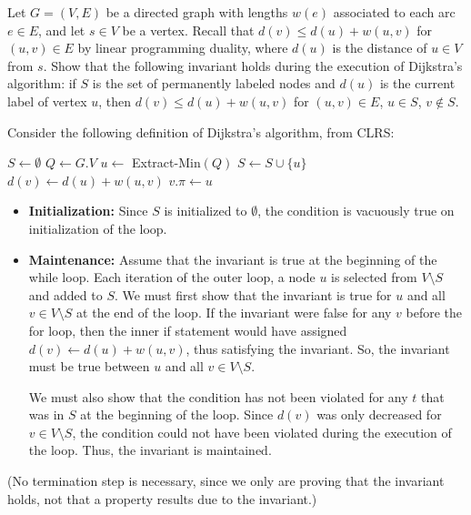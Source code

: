 \documentclass[fleqn]{homework}
\begin{document}
  \begin{problem}{3}
    \begin{question}
      Let $G=(V, E)$ be a directed graph with lengths $w(e)$ associated to each
      arc $e \in E$, and let $s \in V$ be a vertex. Recall that
      $d(v) \le d(u) + w(u,v)$ for $(u,v) \in E$ by linear programming duality,
      where $d(u)$ is the distance of $u \in V$ from $s$. Show that the
      following invariant holds during the execution of Dijkstra's algorithm: if
      $S$ is the set of permanently labeled nodes and $d(u)$ is the current
      label of vertex $u$, then $d(v) \le d(u) + w(u,v)$ for $(u,v) \in E$,
      $u \in S$, $v \not\in S$.
    \end{question}

    Consider the following definition of Dijkstra's algorithm, from CLRS:

    \begin{algorithmic}
        \State $S \gets \emptyset$
        \State $Q \gets G.V$
          \State $u \gets$ Extract-Min$(Q)$
          \State $S \gets S \cup \{u\}$
              \State $d(v) \gets d(u) + w(u,v)$
              \State $v.\pi \gets u$  
            \EndIf
          \EndFor
        \EndWhile
      \EndFunction
    \end{algorithmic}

    \begin{itemize}
    \item \textbf{Initialization:} Since $S$ is initialized to $\emptyset$, the
      condition is vacuously true on initialization of the loop.
    \item \textbf{Maintenance:} Assume that the invariant is true at the
      beginning of the while loop.  Each iteration of the outer loop, a node $u$
      is selected from $V \setminus S$ and added to $S$.  We must first show
      that the invariant is true for $u$ and all $v\in V\setminus S$ at the end
      of the loop.  If the invariant were false for any $v$ before the for loop,
      then the inner if statement would have assigned
      $d(v) \gets d(u) + w(u,v)$, thus satisfying the invariant.  So, the
      invariant must be true between $u$ and all $v \in V \setminus S$.

      We must also show that the condition has not been violated for any $t$
      that was in $S$ at the beginning of the loop.  Since $d(v)$ was only
      decreased for $v \in V \setminus S$, the condition could not have been
      violated during the execution of the loop.  Thus, the invariant is
      maintained.
    \end{itemize}

    (No termination step is necessary, since we only are proving that the
    invariant holds, not that a property results due to the invariant.)
  \end{problem}
\end{document}
